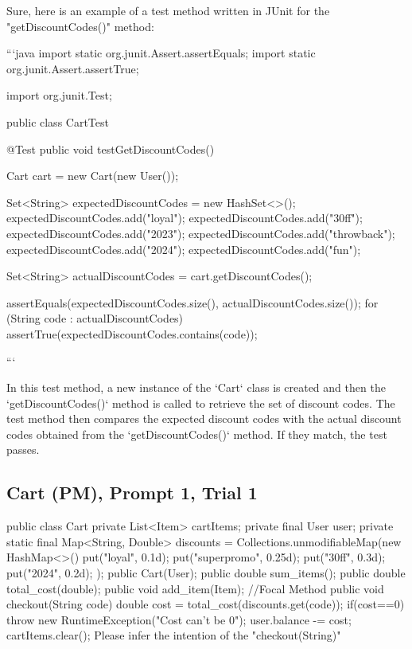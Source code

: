 \begin{answer}
Sure, here is an example of a test method written in JUnit for the "getDiscountCodes()" method:

```java
import static org.junit.Assert.assertEquals;
import static org.junit.Assert.assertTrue;

import org.junit.Test;

public class CartTest {

    @Test
    public void testGetDiscountCodes() {
        Cart cart = new Cart(new User());
        
        Set<String> expectedDiscountCodes = new HashSet<>();
        expectedDiscountCodes.add("loyal");
        expectedDiscountCodes.add("30ff");
        expectedDiscountCodes.add("2023");
        expectedDiscountCodes.add("throwback");
        expectedDiscountCodes.add("2024");
        expectedDiscountCodes.add("fun");
        
        Set<String> actualDiscountCodes = cart.getDiscountCodes();
        
        assertEquals(expectedDiscountCodes.size(), actualDiscountCodes.size());
        for (String code : actualDiscountCodes) {
            assertTrue(expectedDiscountCodes.contains(code));
        }
    }
}
```

In this test method, a new instance of the `Cart` class is created and then the `getDiscountCodes()` method is called to retrieve the set of discount codes. The test method then compares the expected discount codes with the actual discount codes obtained from the `getDiscountCodes()` method. If they match, the test passes.  
\end{answer}

\subsection{Cart (PM), Prompt 1, Trial 1}

\begin{prompt}
  public class Cart {
    private List<Item> cartItems;
    private final User user;
    private static final Map<String, Double> discounts = Collections.unmodifiableMap(new HashMap<>() {{
        put("loyal", 0.1d);
        put("superpromo", 0.25d);
        put("30ff", 0.3d);
        put("2024", 0.2d);
    }});
    public Cart(User);
    public double sum_items();
    public double total_cost(double);
    public void add_item(Item);
    //Focal Method
    public void checkout(String code) {
        double cost = total_cost(discounts.get(code));
        if(cost==0)
            throw new RuntimeException("Cost can't be 0");
        user.balance -= cost;
        cartItems.clear();
    }
}
Please infer the intention of the "checkout(String)"
\end{prompt}

